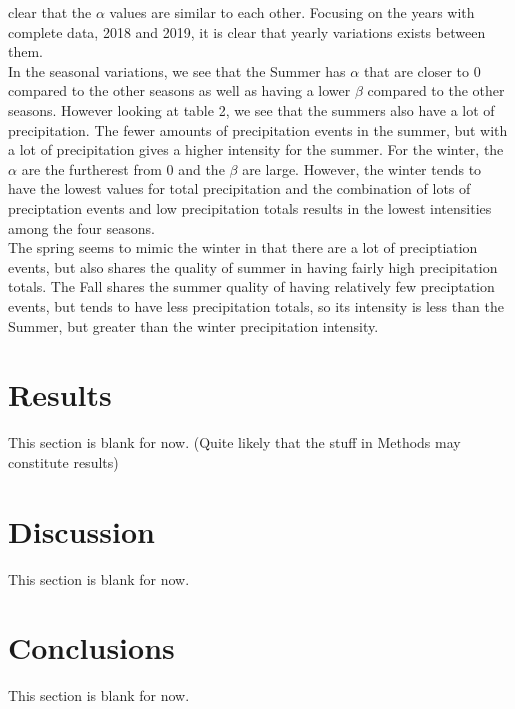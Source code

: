 \documentclass[11pt]{report}
\begin{document}
clear that the $\alpha$ values are similar to each other. Focusing on
the years with complete data, 2018 and 2019, it is clear that yearly
variations exists between them. 
\\In the seasonal variations, we see that the Summer has $\alpha $ that are closer to 0 compared to the other seasons as well as having a lower $\beta$ compared to the other seasons. However looking at table 2, we see  that the summers also have a lot of precipitation. The fewer amounts of precipitation events in the summer, but with a lot of precipitation gives a higher intensity for the summer. For the winter, the $\alpha$ are the furtherest from 0 and the $\beta$ are large. However, the winter tends to have the lowest values for total precipitation and the combination of lots of preciptation events and low precipitation totals results in the lowest intensities among the four seasons. 
\\ The spring seems to mimic the winter in that there are a lot of preciptiation events, but also shares the quality of summer in having fairly high precipitation totals. The Fall shares the summer quality of having relatively few preciptation events, but tends to have less precipitation totals, so its intensity is less than the Summer, but greater than the winter precipitation intensity. 


\section{Results \label{sec:results}}
This section is blank for now. (Quite likely that the stuff in Methods may constitute results)

\section{Discussion \label{sec:discussion}}
This section is blank for now. 

\section{Conclusions \label{sec:conclusions}}
This section is blank for now. 

\small
\renewcommand{\bibsep}{0em}

\renewcommand{\bibname}{References}


\end{document}
